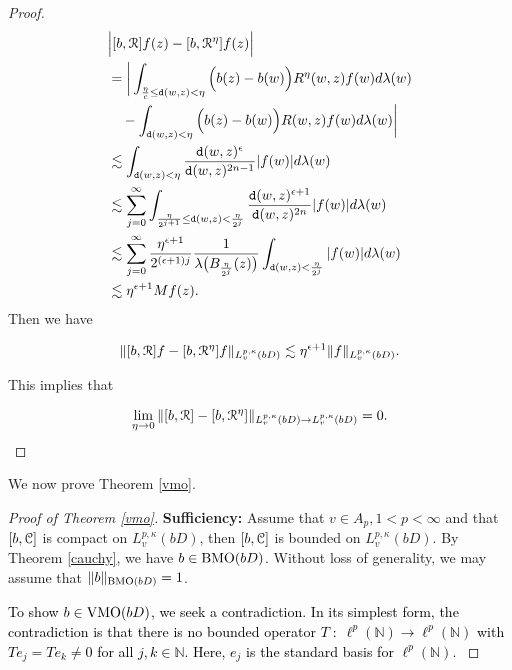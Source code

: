 \documentclass[11pt,a4paper]{amsart}
\numberwithin{equation}{section}
\begin{document}
{\begin{proof}
\begin{align*}
 &\Big|[b, \EuScript R]f(z)-[b, \EuScript R^\eta]f(z)\Big|\\
 &= \bigg|\int_{{\eta \over c}\leq {\tt d}(w,z)<\eta}\Big(b(z)-b(w)\Big)R^\eta(w,z)f(w)d\lambda(w) \\
 &\quad- \int_{ {\tt d}(w,z)<\eta}\Big(b(z)-b(w)\Big)R(w,z)f(w)d\lambda(w)   \bigg|\\
&\lesssim \int_{ {\tt d}(w,z)<\eta}{{\tt d}(w,z)^\epsilon\over {\tt d}(w,z)^{2n-1}}|f(w)|d\lambda(w)\\
&\lesssim \sum_{j=0}^{\infty}\int_{ {\eta\over 2^{j+1}}\leq{\tt d}(w,z)<{\eta\over 2^{j}}}{{\tt d}(w,z)^{\epsilon+1}\over {\tt d}(w,z)^{2n}}|f(w)|d\lambda(w)\\
&\lesssim \sum_{j=0}^{\infty}{\eta^{\epsilon+1}\over 2^{(\epsilon+1)j}}{1\over \lambda\big(B_{{\eta\over 2^{j}}}(z) \big)}\int_{ {\tt d}(w,z)<{\eta\over 2^{j}}}|f(w)|d\lambda(w)\\
&\lesssim \eta^{\epsilon+1}Mf(z).
\end{align*}
Then we have

$$ \|[b, \EuScript R]f-[b, \EuScript R^\eta]f\|_{L_v^{p,\kappa}(bD)}\lesssim \eta^{\epsilon+1} \|f\|_{L_v^{p,\kappa}(bD)}. $$

This implies that

$$\lim_{\eta\to0} \|[b, \EuScript R]-[b, \EuScript R^\eta]\|_{L_v^{p,\kappa}(bD)\to L_v^{p,\kappa}(bD)}=0.$$
\end{proof}





We now prove  Theorem \ref{vmo}.







\medskip

\begin{proof}[Proof of   Theorem \ref{vmo}]
{\bf Sufficiency:}
Assume that $v\in A_p, 1<p<\infty$ and that $[b, \EuScript C]$ is compact on $L_v^{p,\kappa}(bD)$, then $[b,\EuScript C]$ is bounded on $L_v^{p,\kappa}(bD)$. By  Theorem \ref{cauchy}, we have $b\in {\rm BMO}(bD)$. Without loss of generality, we may assume that $\|b\|_{  {\rm BMO}(bD) }=1$.

\textcolor{black}{
To show $b\in {\rm VMO}(bD)$, we  seek a contradiction.  In its simplest form, the contradiction is that there is no bounded operator $T \;:\; \ell^{p} (\mathbb N) \to \ell^{p} (\mathbb N)$ with $Te_{j } = T e_{k} \neq 0$ for all $j,k\in \mathbb N$.  Here, $e_{j}$ is the
standard basis for $\ell^{p} (\mathbb N)$.  }


\end{proof}}
\end{document}
